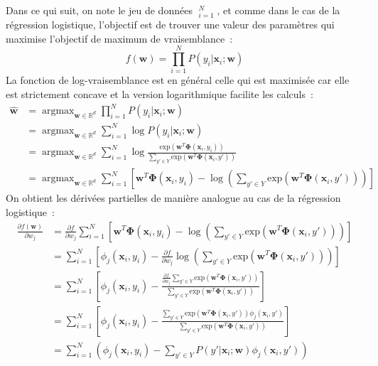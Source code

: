 \documentclass[11pt,openany]{book}
\begin{document}
Dans ce qui suit, on note le jeu de
données $\mathop{(\mathbf{x}_i,y_i)}_{i=1}^N$, et comme dans le cas de
la régression logistique, l'objectif est de trouver une valeur des
paramètres qui maximise l'objectif de maximum de vraisemblance~:
\begin{equation}
f(\mathbf{w}) =  \prod_{i=1}^N P(y_i|\mathbf{x}_i;\mathbf{w})
\end{equation}
La fonction de log-vraisemblance est en général celle qui est
maximisée car elle est strictement concave et la version logarithmique
facilite les calculs~:
\begin{align}
\nonumber
\hat{\mathbf{w}} &=\mathop{\text{argmax}}_{\mathbf{w} \in
  \mathbb{R}^d} \prod_{i=1}^N P(y_i|\mathbf{x}_i;\mathbf{w})\\
\nonumber
&= \mathop{\text{argmax}}_{\mathbf{w} \in \mathbb{R}^d} \sum_{i=1}^N
\log P(y_i|\mathbf{x}_i;\mathbf{w})\\
\nonumber
&= \mathop{\text{argmax}}_{\mathbf{w} \in \mathbb{R}^d} 
\sum_{i=1}^N \log \frac{\text{exp}(\mathbf{w}^T
  \boldsymbol\Phi(\mathbf{x}_i,y_i)) } 
{\sum_{y'\in Y}\text{exp}(\mathbf{w}^T
  \boldsymbol\Phi(\mathbf{x}_i,y')) }\\
&=\mathop{\text{argmax}}_{\mathbf{w} \in \mathbb{R}^d} 
\sum_{i=1}^N \left[\mathbf{w}^T
  \boldsymbol\Phi(\mathbf{x}_i,y_i)  
-\log\left(\sum_{y'\in Y}\text{exp}(\mathbf{w}^T
  \boldsymbol\Phi(\mathbf{x}_i,y')) \right)\right]
\end{align}
On obtient les dérivées partielles de manière analogue au cas de la régression logistique~:
\begin{align}
\nonumber
\frac{\partial f(\mathbf{w})}{\partial w_j} &=\frac{\partial
  f}{\partial w_j} \sum_{i=1}^N \left[\mathbf{w}^T
  \boldsymbol\Phi(\mathbf{x}_i,y_i)  
-\log\left(\sum_{y'\in Y}\text{exp}(\mathbf{w}^T
  \boldsymbol\Phi(\mathbf{x}_i,y'))\right) \right] \\
\nonumber
&= \sum_{i=1}^N 
\left[  \phi_j(\mathbf{x}_i,y_i)  
- \frac{\partial
  f}{\partial w_j}\log\left(\sum_{y'\in Y}\text{exp}(\mathbf{w}^T
  \boldsymbol\Phi(\mathbf{x}_i,y')) \right)\right] \\
\nonumber
&=\sum_{i=1}^N 
\left[  \phi_j(\mathbf{x}_i,y_i)  
-\frac{\frac{\partial f}{\partial w_j}\sum_{y'\in Y} 
  \text{exp}(\mathbf{w}^T \boldsymbol\Phi(\mathbf{x}_i,y'))  }{\sum_{y'\in Y}\text{exp}(\mathbf{w}^T \boldsymbol\Phi(\mathbf{x}_i,y')) }
\right]\\
\label{eq-triptrap}
&=\sum_{i=1}^N 
\left[  \phi_j(\mathbf{x}_i,y_i)  
-\frac{ \sum_{y'\in Y}\text{exp}(\mathbf{w}^T
  \boldsymbol\Phi(\mathbf{x}_i,y')) \phi_j(\mathbf{x}_i,y')  }{\sum_{y'\in
    Y}\text{exp}(\mathbf{w}^T \boldsymbol\Phi(\mathbf{x}_i,y')) } 
\right] \\
\label{eq-multinomial-derivative}
&=\sum_{i=1}^N 
( \phi_j(\mathbf{x}_i,y_i)  
- \sum_{y'\in Y} P(y' | \mathbf{x}_i;\mathbf{w})  \phi_j(\mathbf{x}_i,y'))
\end{align}
\end{document}
